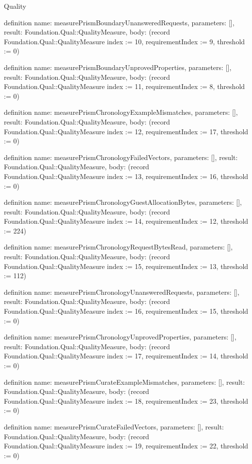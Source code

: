 \begin{lexlean}{Quality}
\begin{semanticmodule}
definition{
  name: measurePrismBoundaryUnansweredRequests,
  parameters: [],
  result: Foundation.Qual::QualityMeasure,
  body: (record Foundation.Qual::QualityMeasure {index := 10, requirementIndex := 9, threshold := 0})
}

definition{
  name: measurePrismBoundaryUnprovedProperties,
  parameters: [],
  result: Foundation.Qual::QualityMeasure,
  body: (record Foundation.Qual::QualityMeasure {index := 11, requirementIndex := 8, threshold := 0})
}

definition{
  name: measurePrismChronologyExampleMismatches,
  parameters: [],
  result: Foundation.Qual::QualityMeasure,
  body: (record Foundation.Qual::QualityMeasure {index := 12, requirementIndex := 17, threshold := 0})
}

definition{
  name: measurePrismChronologyFailedVectors,
  parameters: [],
  result: Foundation.Qual::QualityMeasure,
  body: (record Foundation.Qual::QualityMeasure {index := 13, requirementIndex := 16, threshold := 0})
}

definition{
  name: measurePrismChronologyGuestAllocationBytes,
  parameters: [],
  result: Foundation.Qual::QualityMeasure,
  body: (record Foundation.Qual::QualityMeasure {index := 14, requirementIndex := 12, threshold := 224})
}

definition{
  name: measurePrismChronologyRequestBytesRead,
  parameters: [],
  result: Foundation.Qual::QualityMeasure,
  body: (record Foundation.Qual::QualityMeasure {index := 15, requirementIndex := 13, threshold := 112})
}

definition{
  name: measurePrismChronologyUnansweredRequests,
  parameters: [],
  result: Foundation.Qual::QualityMeasure,
  body: (record Foundation.Qual::QualityMeasure {index := 16, requirementIndex := 15, threshold := 0})
}

definition{
  name: measurePrismChronologyUnprovedProperties,
  parameters: [],
  result: Foundation.Qual::QualityMeasure,
  body: (record Foundation.Qual::QualityMeasure {index := 17, requirementIndex := 14, threshold := 0})
}

definition{
  name: measurePrismCurateExampleMismatches,
  parameters: [],
  result: Foundation.Qual::QualityMeasure,
  body: (record Foundation.Qual::QualityMeasure {index := 18, requirementIndex := 23, threshold := 0})
}

definition{
  name: measurePrismCurateFailedVectors,
  parameters: [],
  result: Foundation.Qual::QualityMeasure,
  body: (record Foundation.Qual::QualityMeasure {index := 19, requirementIndex := 22, threshold := 0})
}


\end{semanticmodule}
\end{lexlean}

